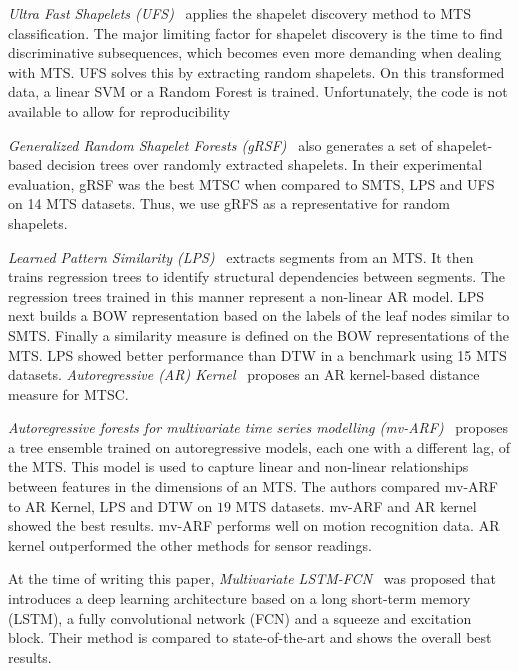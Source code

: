 \documentclass[sigconf]{acmart}
\begin{document}
\emph{Ultra Fast Shapelets (UFS)}~\cite{wistuba2015ultra} applies the shapelet discovery method to MTS classification. The major limiting factor for shapelet discovery is the time to find discriminative subsequences, which becomes even more demanding when dealing with MTS. UFS solves this by extracting random shapelets. On this transformed data, a linear SVM or a Random Forest is trained. Unfortunately, the code is not available to allow for reproducibility 

\emph{Generalized Random Shapelet Forests (gRSF)}~\cite{karlsson2016generalized} also generates a set of shapelet-based decision trees over randomly extracted shapelets. In their experimental evaluation, gRSF was the best MTSC when compared to SMTS, LPS and UFS on 14 MTS datasets. Thus, we use gRFS as a representative for random shapelets.

\emph{Learned Pattern Similarity (LPS)}~\cite{baydogan2016time} extracts segments from an MTS. It then trains regression trees to identify structural dependencies between segments. The regression trees trained in this	manner represent a non-linear AR model. LPS next builds a BOW representation based on the labels of the leaf nodes similar to SMTS. Finally a similarity measure is defined on the BOW representations of the MTS. LPS showed better performance than DTW in a benchmark using 15 MTS datasets.
\emph{Autoregressive (AR) Kernel}~\cite{cuturi2011autoregressive} proposes an AR kernel-based distance measure for MTSC.

\emph{Autoregressive forests for multivariate time series modelling (mv-ARF)}~\cite{tuncel2018autoregressive} proposes a tree ensemble trained on autoregressive models, each one with a different lag, of the MTS. 
This model is used to capture linear and non-linear relationships between features in the dimensions of an MTS.
The authors compared mv-ARF to AR Kernel, LPS and DTW on $19$ MTS datasets. mv-ARF and AR kernel showed the best results. mv-ARF performs well on motion recognition data. AR kernel outperformed the other methods for sensor readings.

At the time of writing this paper, \emph{Multivariate LSTM-FCN}~\cite{karim2018multivariate} was proposed that introduces a deep learning architecture based on a long short-term memory  (LSTM), a fully convolutional network (FCN) and a squeeze and excitation block. Their method is compared to state-of-the-art and shows the overall best results. 
\end{document}
